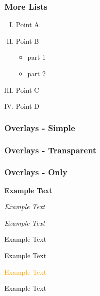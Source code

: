 \documentclass[14pt]{beamer}
\begin{document}
\begin{frame}
\frametitle{More Lists}
\begin{enumerate}[(I)]
	\item<1-> Point A
	\item<2-> Point B
	\begin{itemize}
		\item<3-> part 1
		\item<4-> part 2
	\end{itemize}
	\item<5-> Point C
	\item<6-> Point D
\end{enumerate}
\end{frame}

\begin{frame}
\frametitle{Overlays - Simple}



\end{frame}

\begin{frame}
\frametitle{Overlays - Transparent}



\end{frame}

\begin{frame}
\frametitle{Overlays - Only}


\end{frame}

\begin{frame}
\textbf<2>{Example Text}

\textit<2>{Example Text}

\textsl<2>{Example Text}

\textrm<2>{Example Text}

\textsf<2>{Example Text}

\textcolor<2>{orange}{Example Text}

\alert<2>{Example Text}

\end{frame}
\end{document}

